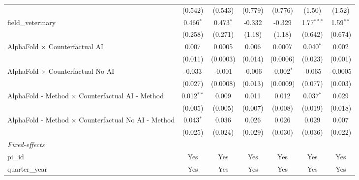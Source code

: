 \begin{tabular}{lcccccc}
                                                               & (0.542)        & (0.543)        & (0.779)        & (0.776)        & (1.50)        & (1.52)\\   
   field\_veterinary                                           & 0.466$^{*}$    & 0.473$^{*}$    & -0.332         & -0.329         & 1.77$^{***}$  & 1.59$^{**}$\\   
                                                               & (0.258)        & (0.271)        & (1.18)         & (1.18)         & (0.642)       & (0.674)\\   
   AlphaFold $\times$ Counterfactual AI                        & 0.007          & 0.0005         & 0.006          & 0.0007         & 0.040$^{*}$   & 0.002\\   
                                                               & (0.011)        & (0.0003)       & (0.014)        & (0.0006)       & (0.023)       & (0.001)\\   
   AlphaFold $\times$ Counterfactual No AI                     & -0.033         & -0.001         & -0.006         & -0.002$^{*}$   & -0.065        & -0.0005\\   
                                                               & (0.027)        & (0.0008)       & (0.013)        & (0.0009)       & (0.077)       & (0.003)\\   
   AlphaFold - Method $\times$ Counterfactual AI - Method      & 0.012$^{**}$   & 0.009          & 0.011          & 0.012          & 0.037$^{*}$   & 0.029\\   
                                                               & (0.005)        & (0.005)        & (0.007)        & (0.008)        & (0.019)       & (0.018)\\   
   AlphaFold - Method $\times$ Counterfactual No AI - Method   & 0.043$^{*}$    & 0.036          & 0.026          & 0.026          & 0.029         & 0.007\\   
                                                               & (0.025)        & (0.024)        & (0.029)        & (0.030)        & (0.036)       & (0.022)\\   
   \midrule
   \emph{Fixed-effects}\\
   pi\_id                                                      & Yes            & Yes            & Yes            & Yes            & Yes           & Yes\\  
   quarter\_year                                               & Yes            & Yes            & Yes            & Yes            & Yes           & Yes\\  

\end{tabular}
